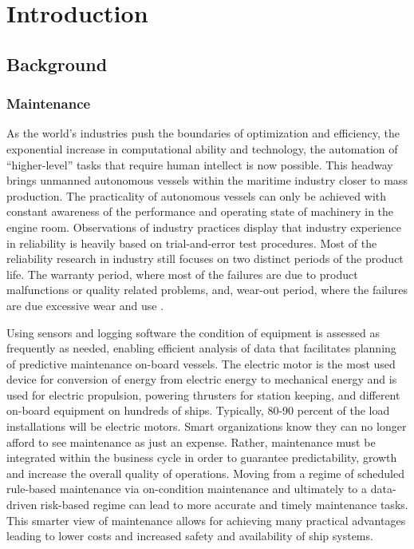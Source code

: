 \section{Introduction}
\label{sec:introduction}
\subsection{Background}
\subsubsection{Maintenance}
As the world’s industries push the boundaries of optimization and efficiency, the exponential increase in computational ability and technology, the automation of “higher-level” tasks that require human intellect is now possible. This headway brings unmanned autonomous vessels within the maritime industry closer to mass production. The practicality of autonomous vessels can only be achieved with constant awareness of the performance and operating state of machinery in the engine room. Observations of industry practices display that industry experience in reliability is heavily based on trial-and-error test procedures. Most of the reliability research in industry still focuses on two distinct periods of the product life. The warranty period, where most of the failures are due to product malfunctions or quality related problems, and, wear-out period, where the failures are due excessive wear and use \cite{thomas_warranty_1999}.

 Using sensors and logging software the condition of equipment is assessed as frequently as needed, enabling efficient analysis of data that facilitates planning of predictive maintenance on-board vessels. The electric motor is the most used device for conversion of energy from electric energy to mechanical energy and is used for electric propulsion, powering thrusters for station keeping, and different on-board equipment on hundreds of ships. Typically, 80-90 percent of the load installations will be electric motors\cite{han_motor_2019}. Smart organizations know they can no longer afford to see maintenance as just an expense. Rather, maintenance must be integrated within the business cycle in order to guarantee predictability, growth and increase the overall quality of operations. Moving from a regime of scheduled rule-based maintenance via on-condition maintenance and ultimately to a data-driven risk-based regime can lead to more accurate and timely maintenance tasks. This smarter view of maintenance allows for achieving many practical advantages leading to lower costs and increased safety and availability of ship systems. 
 
